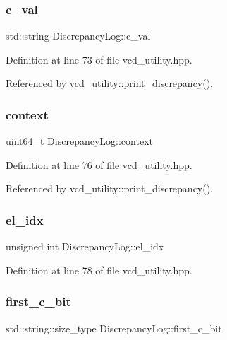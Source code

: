 \subsubsection{\texorpdfstring{c\+\_\+val}{c\_val}}
{\footnotesize\ttfamily std\+::string Discrepancy\+Log\+::c\+\_\+val}



Definition at line 73 of file vcd\+\_\+utility.\+hpp.



Referenced by vcd\+\_\+utility\+::print\+\_\+discrepancy().

\mbox{\label{structDiscrepancyLog_a2f9c6172e9f7765a6c5a5786aca8d480}} 
\subsubsection{\texorpdfstring{context}{context}}
{\footnotesize\ttfamily uint64\+\_\+t Discrepancy\+Log\+::context}



Definition at line 76 of file vcd\+\_\+utility.\+hpp.



Referenced by vcd\+\_\+utility\+::print\+\_\+discrepancy().

\mbox{\label{structDiscrepancyLog_a44d4a9cc80f7f51095a518e842115927}} 
\subsubsection{\texorpdfstring{el\+\_\+idx}{el\_idx}}
{\footnotesize\ttfamily unsigned int Discrepancy\+Log\+::el\+\_\+idx}



Definition at line 78 of file vcd\+\_\+utility.\+hpp.

\mbox{\label{structDiscrepancyLog_a53d9c15b54df4d9076330436ca61b585}} 
\subsubsection{\texorpdfstring{first\+\_\+c\+\_\+bit}{first\_c\_bit}}
{\footnotesize\ttfamily std\+::string\+::size\+\_\+type Discrepancy\+Log\+::first\+\_\+c\+\_\+bit}



